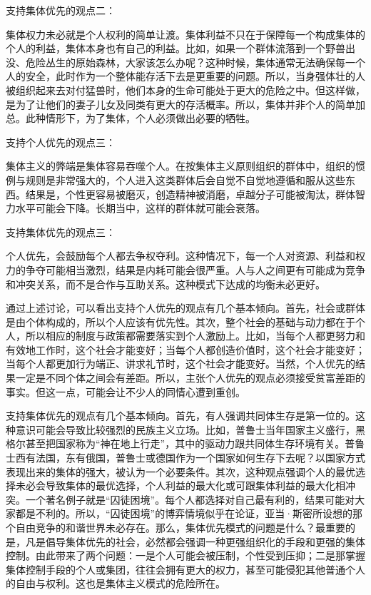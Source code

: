 支持集体优先的观点二：

集体权力未必就是个人权利的简单让渡。集体利益不只在于保障每一个构成集体的个人的利益，集体本身也有自己的利益。比如，如果一个群体流落到一个野兽出没、危险丛生的原始森林，大家该怎么办呢？这种时候，集体通常无法确保每一个人的安全，此时作为一个整体能存活下去是更重要的问题。所以，当身强体壮的人被组织起来去对付猛兽时，他们本身的生命可能处于更大的危险之中。但这样做，是为了让他们的妻子儿女及同类有更大的存活概率。所以，集体并非个人的简单加总。此种情形下，为了集体，个人必须做出必要的牺牲。

支持个人优先的观点三：

集体主义的弊端是集体容易吞噬个人。在按集体主义原则组织的群体中，组织的惯例与规则是非常强大的，个人进入这类群体后会自觉不自觉地遵循和服从这些东西。结果是，个性更容易被磨灭，创造精神被消磨，卓越分子可能被淘汰，群体智力水平可能会下降。长期当中，这样的群体就可能会衰落。

支持集体优先的观点三：

个人优先，会鼓励每个人都去争权夺利。这种情况下，每一个人对资源、利益和权力的争夺可能相当激烈，结果是内耗可能会很严重。人与人之间更有可能成为竞争和冲突关系，而不是合作与互助关系。这种模式下达成的均衡未必更好。

通过上述讨论，可以看出支持个人优先的观点有几个基本倾向。首先，社会或群体是由个体构成的，所以个人应该有优先性。其次，整个社会的基础与动力都在于个人，所以相应的制度与政策都需要落实到个人激励上。比如，当每个人都更努力和有效地工作时，这个社会才能变好；当每个人都创造价值时，这个社会才能变好；当每个人都更加行为端正、讲求礼节时，这个社会才能变好。当然，个人优先的结果一定是不同个体之间会有差距。所以，主张个人优先的观点必须接受贫富差距的事实。但这一点，可能会让不少人的同情心遭到重创。

支持集体优先的观点有几个基本倾向。首先，有人强调共同体生存是第一位的。这种意识可能会导致比较强烈的民族主义立场。比如，普鲁士当年国家主义盛行，黑格尔甚至把国家称为“神在地上行走”，其中的驱动力跟共同体生存环境有关。普鲁士西有法国，东有俄国，普鲁士或德国作为一个国家如何生存下去呢？以国家方式表现出来的集体的强大，被认为一个必要条件。其次，这种观点强调个人的最优选择未必会导致集体的最优选择，个人利益的最大化或可跟集体利益的最大化相冲突。一个著名例子就是“囚徒困境”。每个人都选择对自己最有利的，结果可能对大家都是不利的。所以，“囚徒困境”的博弈情境似乎在论证，亚当·斯密所设想的那个自由竞争的和谐世界未必存在。那么，集体优先模式的问题是什么？最重要的是，凡是倡导集体优先的社会，必然都会强调一种更强组织化的手段和更强的集体控制。由此带来了两个问题：一是个人可能会被压制，个性受到压抑；二是那掌握集体控制手段的个人或集团，往往会拥有更大的权力，甚至可能侵犯其他普通个人的自由与权利。这也是集体主义模式的危险所在。

